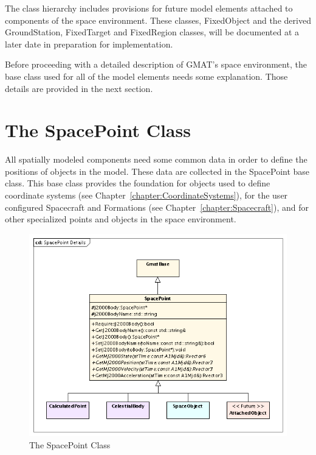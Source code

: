 The class hierarchy includes provisions for future model elements attached to components of the
space environment.  These classes, FixedObject and the derived GroundStation, FixedTarget and
FixedRegion classes, will be documented at a later date in preparation for implementation.

Before proceeding with a detailed description of GMAT's space environment, the base class used for
all of the model elements needs some explanation.  Those details are provided in the next section.

\section{\label{section:SpacePoint}The SpacePoint Class}

All spatially modeled components need some common data in order to define the positions of objects
in the model.  These data are collected in the SpacePoint base class.  This base class provides the
foundation for objects used to define coordinate systems (see
Chapter~\ref{chapter:CoordinateSystems}), for the user configured Spacecraft and Formations (see
Chapter~\ref{chapter:Spacecraft}), and for other specialized points and objects in the space
environment.

\begin{figure}[htb]
\begin{center}
\includegraphics[300,235]{Images/SpacePointDetails}
\caption{\label{figure:SpacePointDetails}The SpacePoint Class}
\end{center}
\end{figure}

